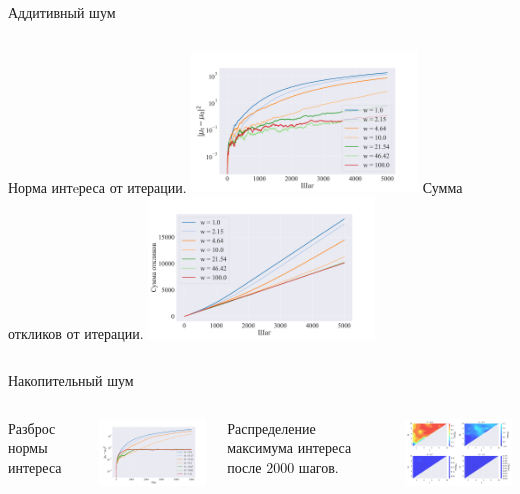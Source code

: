 \documentclass{beamer}
\begin{document}
\begin{frame}{Аддитивный шум} 
\begin{columns}[T]
Норма интeреса от итерации.
\includegraphics[width=6cm]{../../figures/norm_interest.pdf}
Сумма откликов от итерации.  
\includegraphics[width=6cm]{../../figures/rewards.pdf}
\end{columns}

\end{frame}
\begin{frame}{Накопительный шум}
\begin{columns}[T]

Разброс нормы интереса
\begin{center}
  \includegraphics[width=6cm]{../../figures/winstreak_norm_interest.pdf}
\end{center}
Распределение максимума интереса после $2000$ шагов.
\begin{center}
  \includegraphics[width=6cm]{../../figures/countour_Mlb_part.pdf}
\end{center}
\end{columns}
\end{frame}
\end{document}
